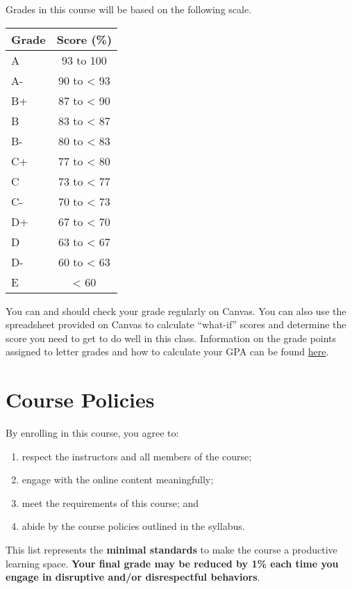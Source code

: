 \documentclass[
  letterpaper,
]{article}
\providecommand{\tightlist}{%
  \setlength{\itemsep}{0pt}\setlength{\parskip}{0pt}}\usepackage{longtable,booktabs,array}
\begin{document}
Grades in this course will be based on the following scale.

\begin{longtable}[]{@{}lc@{}}
\toprule\noalign{}
Grade & Score (\%) \\
\midrule\noalign{}
\endhead
\bottomrule\noalign{}
\endlastfoot
A & 93 to 100 \\
A- & 90 to \textless{} 93 \\
B+ & 87 to \textless{} 90 \\
B & 83 to \textless{} 87 \\
B- & 80 to \textless{} 83 \\
C+ & 77 to \textless{} 80 \\
C & 73 to \textless{} 77 \\
C- & 70 to \textless{} 73 \\
D+ & 67 to \textless{} 70 \\
D & 63 to \textless{} 67 \\
D- & 60 to \textless{} 63 \\
E & \textless{} 60 \\
\end{longtable}

You can and should check your grade regularly on Canvas. You can also
use the spreadsheet provided on Canvas to calculate ``what-if'' scores
and determine the score you need to get to do well in this class.
Information on the grade points assigned to letter grades and how to
calculate your GPA can be found
\href{https://advising.utah.edu/academic-standards/gpa-calculator-new.php}{here}.

\section{Course Policies}\label{sec-policies}

By enrolling in this course, you agree to:

\begin{enumerate}
\def\labelenumi{\arabic{enumi}.}
\tightlist
\item
  respect the instructors and all members of the course;
\item
  engage with the online content meaningfully;
\item
  meet the requirements of this course; and
\item
  abide by the course policies outlined in the syllabus.
\end{enumerate}

This list represents the \textbf{minimal standards} to make the course a
productive learning space. \textbf{Your final grade may be reduced by
1\% each time you engage in disruptive and/or disrespectful behaviors}.
\end{document}

